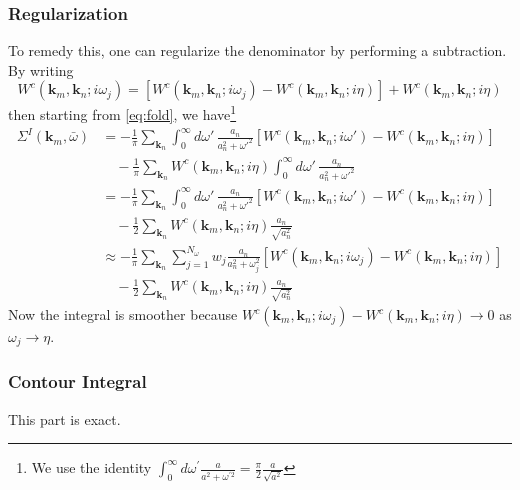 \subsubsection{Regularization}
 To remedy this, one can regularize the denominator by performing a subtraction. By writing 
\begin{equation}
    W^c\left(\mathbf{k}_m,\mathbf{k}_n;i\omega_j\right) = \left[ W^c\left(\mathbf{k}_m,\mathbf{k}_n;i\omega_j\right) - W^c\left(\mathbf{k}_m,\mathbf{k}_n;i\eta\right) \right] + W^c\left(\mathbf{k}_m,\mathbf{k}_n;i\eta\right)
\end{equation}
then starting from \eqref{eq:fold}, we have\footnote{We use the identity $\int_0^{\infty} d \omega^{\prime} \frac{a}{a^2+\omega^{\prime 2}}=\frac{\pi}{2} \frac{a}{\sqrt{a^2}}$}
\begin{align}
    \Sigma^I\left(\mathbf{k}_m,\bar{\omega}\right)
&=
-\frac{1}{\pi}
\sum_{\mathbf{k}_n}
\int_0^\infty
d\omega'\,
\frac{a_n}{a_n^2+\omega'^2}
\left[W^c\left(\mathbf{k}_m,\mathbf{k}_n;i\omega'\right) - W^c\left(\mathbf{k}_m,\mathbf{k}_n;i\eta\right)\right] \\
&\quad -\frac{1}{\pi}
\sum_{\mathbf{k}_n}
W^c\left(\mathbf{k}_m,\mathbf{k}_n;i\eta\right)
\int_0^\infty
d\omega'\,\frac{a_n}{a_n^2+\omega'^2}\\
&=
-\frac{1}{\pi}
\sum_{\mathbf{k}_n}
\int_0^\infty
d\omega'\,
\frac{a_n}{a_n^2+\omega'^2}
\left[W^c\left(\mathbf{k}_m,\mathbf{k}_n;i\omega'\right) - W^c\left(\mathbf{k}_m,\mathbf{k}_n;i\eta\right)\right] \\
&\quad -\frac{1}{2}
\sum_{\mathbf{k}_n}
W^c\left(\mathbf{k}_m,\mathbf{k}_n;i\eta\right)
\frac{a_n}{\sqrt{a_n^2}}\\
&\approx
-\frac{1}{\pi}
\sum_{\mathbf{k}_n}
\sum_{j=1}^{N_\omega}
w_j \frac{a_n}{a_n^2+\omega_j^2}
\left[W^c\left(\mathbf{k}_m,\mathbf{k}_n;i\omega_j\right) - W^c\left(\mathbf{k}_m,\mathbf{k}_n;i\eta\right)\right] \\
&\quad -\frac{1}{2}
\sum_{\mathbf{k}_n}
W^c\left(\mathbf{k}_m,\mathbf{k}_n;i\eta\right)
\frac{a_n}{\sqrt{a_n^2}}
\end{align}
Now the integral is smoother because $W^c\left(\mathbf{k}_m,\mathbf{k}_n;i\omega_j\right) - W^c\left(\mathbf{k}_m,\mathbf{k}_n;i\eta\right)\rightarrow 0$ as $\omega_j \rightarrow \eta$.
\subsubsection{Contour Integral}
This part is exact. 

